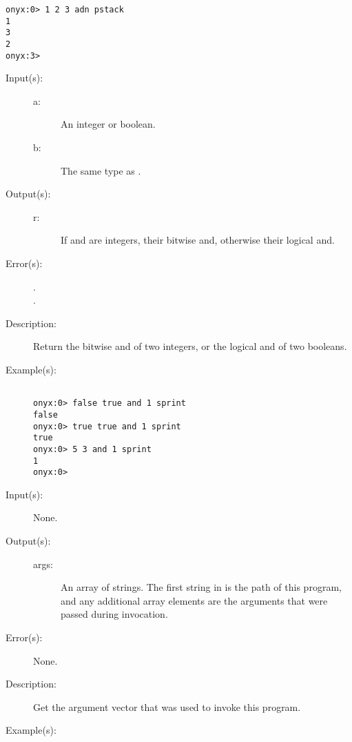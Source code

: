 \begin{description}
\begin{description}
\begin{verbatim}
onyx:0> 1 2 3 adn pstack
1
3
2
onyx:3>
		\end{verbatim}
	\end{description}
\label{systemdict:and}
\item[{\onyxop{a b}{and}{r}}: ]
	\begin{description}\item[]
	\item[Input(s): ]
		\begin{description}\item[]
		\item[a: ]
			An integer or boolean.
		\item[b: ]
			The same type as .
		\end{description}
	\item[Output(s): ]
		\begin{description}\item[]
		\item[r: ]
			If  and  are integers, their bitwise
			and, otherwise their logical and.
		\end{description}
	\item[Error(s): ]
		\begin{description}\item[]
		\item[.]
		\item[.]
		\end{description}
	\item[Description: ]
		Return the bitwise and of two integers, or the logical and of
		two booleans.
	\item[Example(s): ]\begin{verbatim}

onyx:0> false true and 1 sprint
false
onyx:0> true true and 1 sprint
true
onyx:0> 5 3 and 1 sprint
1
onyx:0>
		\end{verbatim}
	\end{description}
\label{systemdict:argv}
\item[{\onyxop{--}{argv}{args}}: ]
	\begin{description}\item[]
	\item[Input(s): ] None.
	\item[Output(s): ]
		\begin{description}\item[]
		\item[args: ]
			An array of strings.  The first string in 
			is the path of this program, and any additional
			array elements are the arguments that were passed during
			invocation.
		\end{description}
	\item[Error(s): ] None.
	\item[Description: ]
		Get the argument vector that was used to invoke this program.
	\item[Example(s): ]\begin{verbatim}


\end{verbatim}
\end{description}
\end{description}
